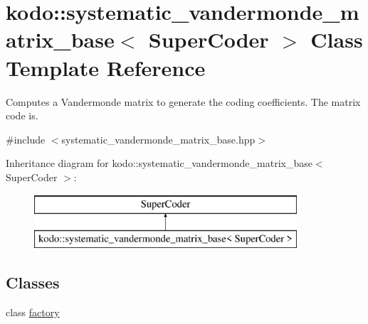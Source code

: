 \hypertarget{classkodo_1_1systematic__vandermonde__matrix__base}{\section{kodo\-:\-:systematic\-\_\-vandermonde\-\_\-matrix\-\_\-base$<$ Super\-Coder $>$ Class Template Reference}
\label{classkodo_1_1systematic__vandermonde__matrix__base}
}


Computes a Vandermonde matrix to generate the coding coefficients. The matrix code is.  




{\ttfamily \#include $<$systematic\-\_\-vandermonde\-\_\-matrix\-\_\-base.\-hpp$>$}

Inheritance diagram for kodo\-:\-:systematic\-\_\-vandermonde\-\_\-matrix\-\_\-base$<$ Super\-Coder $>$\-:\begin{figure}[H]
\begin{center}
\leavevmode
\includegraphics[height=2.000000cm]{classkodo_1_1systematic__vandermonde__matrix__base}
\end{center}
\end{figure}
\subsection*{Classes}
\begin{DoxyCompactItemize}
\item 
class \hyperlink{classkodo_1_1systematic__vandermonde__matrix__base_1_1factory}{factory}
\end{DoxyCompactItemize}
